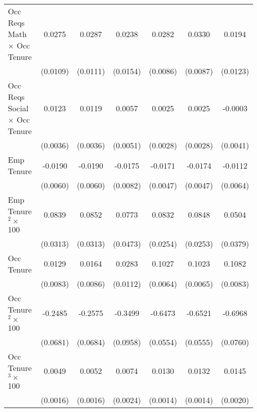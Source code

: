 {\begin{longtable}{l*{6}{c}}
Occ Reqs Math $\times$ Occ Tenure&      0.0275\sym{**} &      0.0287\sym{***}&      0.0238         &      0.0282\sym{***}&      0.0330\sym{***}&      0.0194         \\
                    &    (0.0109)         &    (0.0111)         &    (0.0154)         &    (0.0086)         &    (0.0087)         &    (0.0123)         \\
Occ Reqs Social $\times$ Occ Tenure&      0.0123\sym{***}&      0.0119\sym{***}&      0.0057         &      0.0025         &      0.0025         &     -0.0003         \\
                    &    (0.0036)         &    (0.0036)         &    (0.0051)         &    (0.0028)         &    (0.0028)         &    (0.0041)         \\
Emp Tenure          &     -0.0190\sym{***}&     -0.0190\sym{***}&     -0.0175\sym{**} &     -0.0171\sym{***}&     -0.0174\sym{***}&     -0.0112\sym{*}  \\
                    &    (0.0060)         &    (0.0060)         &    (0.0082)         &    (0.0047)         &    (0.0047)         &    (0.0064)         \\
Emp Tenure$^2\times$ 100&      0.0839\sym{***}&      0.0852\sym{***}&      0.0773         &      0.0832\sym{***}&      0.0848\sym{***}&      0.0504         \\
                    &    (0.0313)         &    (0.0313)         &    (0.0473)         &    (0.0254)         &    (0.0253)         &    (0.0379)         \\
Occ Tenure          &      0.0129         &      0.0164\sym{*}  &      0.0283\sym{**} &      0.1027\sym{***}&      0.1023\sym{***}&      0.1082\sym{***}\\
                    &    (0.0083)         &    (0.0086)         &    (0.0112)         &    (0.0064)         &    (0.0065)         &    (0.0083)         \\
Occ Tenure$^2\times$ 100&     -0.2485\sym{***}&     -0.2575\sym{***}&     -0.3499\sym{***}&     -0.6473\sym{***}&     -0.6521\sym{***}&     -0.6968\sym{***}\\
                    &    (0.0681)         &    (0.0684)         &    (0.0958)         &    (0.0554)         &    (0.0555)         &    (0.0760)         \\
Occ Tenure$^3\times$ 100&      0.0049\sym{***}&      0.0052\sym{***}&      0.0074\sym{***}&      0.0130\sym{***}&      0.0132\sym{***}&      0.0145\sym{***}\\
                    &    (0.0016)         &    (0.0016)         &    (0.0024)         &    (0.0014)         &    (0.0014)         &    (0.0020)         \\

\end{longtable}}
